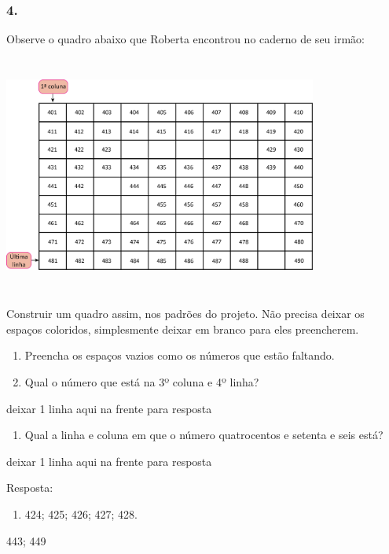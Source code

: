 \subsubsection{4.}\label{section-36}

Observe o quadro abaixo que Roberta encontrou no caderno de seu irmão:

\includegraphics[width=4.05869in,height=3.09193in]{media/image30.png}

Construir um quadro assim, nos padrões do projeto. Não precisa deixar os
espaços coloridos, simplesmente deixar em branco para eles preencherem.

\begin{enumerate}
\def\labelenumi{\alph{enumi})}
\item
  Preencha os espaços vazios como os números que estão faltando.
\item
  Qual o número que está na 3º coluna e 4º linha?
\end{enumerate}

deixar 1 linha aqui na frente para resposta

\begin{enumerate}
\def\labelenumi{\alph{enumi})}
\item
  Qual a linha e coluna em que o número quatrocentos e setenta e seis
  está?
\end{enumerate}

deixar 1 linha aqui na frente para resposta

Resposta:

\begin{enumerate}
\def\labelenumi{\alph{enumi})}
\item
  424; 425; 426; 427; 428.
\end{enumerate}

443; 449

